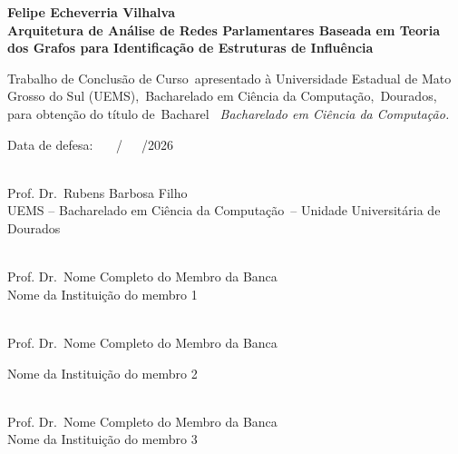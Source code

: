 \documentclass[
      12pt,
      a4paper,
      openright,
      oneside,
      chapter=TITLE,
      section=TITLE,
      english,
      french,
      spanish,
      brazilian
    ]{abntex2}
\newcommand{\nomeDoAutor}{Felipe Echeverria Vilhalva}
\newcommand{\nomeDoCurso}{Bacharelado em Ciência da Computação}
\newcommand{\tituloDoTrabalho}{Arquitetura de Análise de Redes Parlamentares Baseada em Teoria dos Grafos para Identificação de Estruturas de Influência}
\newcommand{\tipoDeTrabalho}{Trabalho de Conclusão de Curso}
\newcommand{\NomeDoCurso}{Bacharelado em Ciência da Computação}
\newcommand{\GrauAcademico}{Bacharel}
\newcommand{\dataDeDefesa}{~~~/~~~/2026}
\newcommand{\nomeDoOrientador}{Rubens Barbosa Filho}
\newcommand{\tituloDoOrientador}{Prof. Dr.}
\newcommand{\nomeDoMembroA}{Nome Completo do Membro da Banca}
\newcommand{\tituloDoMembroA}{Prof. Dr.}
\newcommand{\instituicaomembroA}{Nome da Instituição do membro 1}
\newcommand{\nomeDoMembroB}{Nome Completo do Membro da Banca}
\newcommand{\tituloDoMembroB}{Prof. Dr.}
\newcommand{\instituicaomembroB}{Nome da Instituição do membro 2}
\newcommand{\nomeDoMembroC}{Nome Completo do Membro da Banca}
\newcommand{\tituloDoMembroC}{Prof. Dr.}
\newcommand{\instituicaomembroC}{Nome da Instituição do membro 3}
\newcommand{\nomeDaCidade}{Dourados}
\begin{document}
        \imprimircapa
        \imprimirfolhaderosto
    
        \begin{folhadeaprovacao}
    
            \begin{center}
            \normalsize{\textbf{\MakeUppercase\nomeDoAutor}}\\
            \vspace*{1cm}
            \normalsize{\textbf{\MakeUppercase\tituloDoTrabalho}}
            \end{center}
    
            \vspace*{2cm}
    
           \noindent\tipoDeTrabalho\ apresentado à Universidade Estadual de Mato Grosso do Sul (UEMS),\ \NomeDoCurso,\ \nomeDaCidade, para obtenção do título de\ \GrauAcademico{ }\em\ \nomeDoCurso.
           \par
           \vspace*{1cm}
    
           \noindent Data de defesa: \dataDeDefesa
           \vspace*{1cm}
    
    
           \vspace*{1cm}
    
           \raggedright\makebox[2.5in]{\hrulefill}\\
           \tituloDoOrientador\ \nomeDoOrientador \\ UEMS -- \NomeDoCurso\ -- Unidade Universitária de \nomeDaCidade
    
           \vspace*{1cm}
    
           \raggedright\makebox[2.5in]{\hrulefill}\\
           \tituloDoMembroA\ \nomeDoMembroA \\ \instituicaomembroA
    
           \vspace*{1cm}
    
           \raggedright\makebox[2.5in]{\hrulefill}\\
           \tituloDoMembroB\ \nomeDoMembroB \par \instituicaomembroB
    
           \vspace*{1cm}
    
           \raggedright\makebox[2.5in]{\hrulefill}\\
           \tituloDoMembroC\ \nomeDoMembroC \\ \instituicaomembroC
    
        \end{folhadeaprovacao}
    
\end{document}
